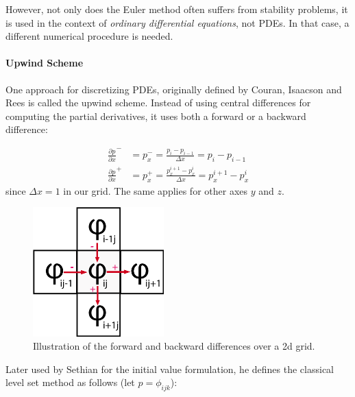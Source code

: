 \documentclass{article}
\begin{document}
However, not only does the Euler method often suffers from stability problems,
it is used in the context of \textit{ordinary differential equations}, not PDEs.
In that case, a different numerical procedure is needed. 

\paragraph{Upwind Scheme}
One approach for discretizing PDEs, originally defined by Couran, Isaacson and
Rees \cite{courant1952solution} is called the upwind scheme. Instead of using
central differences for computing the partial derivatives, it uses both a
forward or a backward difference:

\begin{align}
    \frac{\partial p}{\partial x}^{-} &= p^{-}_x = \frac{p_i -
    p_{i-1}}{ \Delta x} = p_i - p_{i-1} \\
    \frac{\partial p}{\partial x}^{+} &= p^{+}_x = \frac{p^{i+1}_x -
    p^i_x}{ \Delta x} = p^{i+1}_x - p^i_x  
\end{align} since $ \Delta x = 1 $ in our grid. The same applies for other axes
$y$ and $z$.

\begin{figure}[htb]
  \centering
  \includegraphics[width=0.45\textwidth]{img/upwind_grid.png}
  \caption{Illustration of the forward and backward differences over a 2d grid.}    
\end{figure}


Later used by Sethian\cite{sethian1999level} \cite{sethian1999advancing} for
the initial value formulation, he defines the classical level set method as
follows (let $ p = \phi_{ijk}$):
\end{document}
